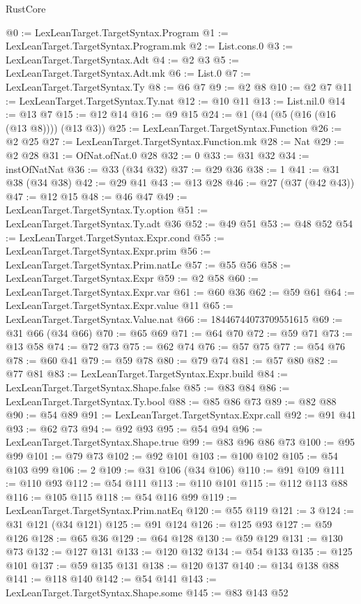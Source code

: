 \begin{lexlean}{RustCore}
\begin{coremodule}
@0 := LexLeanTarget.TargetSyntax.Program
@1 := LexLeanTarget.TargetSyntax.Program.mk
@2 := List.cons.{0}
@3 := LexLeanTarget.TargetSyntax.Adt
@4 := @2 @3
@5 := LexLeanTarget.TargetSyntax.Adt.mk
@6 := List.{0}
@7 := LexLeanTarget.TargetSyntax.Ty
@8 := @6 @7
@9 := @2 @8
@10 := @2 @7
@11 := LexLeanTarget.TargetSyntax.Ty.nat
@12 := @10 @11
@13 := List.nil.{0}
@14 := @13 @7
@15 := @12 @14
@16 := @9 @15
@24 := @1 (@4 (@5 (@16 (@16 (@13 @8)))) (@13 @3))
@25 := LexLeanTarget.TargetSyntax.Function
@26 := @2 @25
@27 := LexLeanTarget.TargetSyntax.Function.mk
@28 := Nat
@29 := @2 @28
@31 := OfNat.ofNat.{0} @28
@32 := 0
@33 := @31 @32
@34 := instOfNatNat
@36 := @33 (@34 @32)
@37 := @29 @36
@38 := 1
@41 := @31 @38 (@34 @38)
@42 := @29 @41
@43 := @13 @28
@46 := @27 (@37 (@42 @43))
@47 := @12 @15
@48 := @46 @47
@49 := LexLeanTarget.TargetSyntax.Ty.option
@51 := LexLeanTarget.TargetSyntax.Ty.adt @36
@52 := @49 @51
@53 := @48 @52
@54 := LexLeanTarget.TargetSyntax.Expr.cond
@55 := LexLeanTarget.TargetSyntax.Expr.prim
@56 := LexLeanTarget.TargetSyntax.Prim.natLe
@57 := @55 @56
@58 := LexLeanTarget.TargetSyntax.Expr
@59 := @2 @58
@60 := LexLeanTarget.TargetSyntax.Expr.var
@61 := @60 @36
@62 := @59 @61
@64 := LexLeanTarget.TargetSyntax.Expr.value @11
@65 := LexLeanTarget.TargetSyntax.Value.nat
@66 := 18446744073709551615
@69 := @31 @66 (@34 @66)
@70 := @65 @69
@71 := @64 @70
@72 := @59 @71
@73 := @13 @58
@74 := @72 @73
@75 := @62 @74
@76 := @57 @75
@77 := @54 @76
@78 := @60 @41
@79 := @59 @78
@80 := @79 @74
@81 := @57 @80
@82 := @77 @81
@83 := LexLeanTarget.TargetSyntax.Expr.build
@84 := LexLeanTarget.TargetSyntax.Shape.false
@85 := @83 @84
@86 := LexLeanTarget.TargetSyntax.Ty.bool
@88 := @85 @86 @73
@89 := @82 @88
@90 := @54 @89
@91 := LexLeanTarget.TargetSyntax.Expr.call
@92 := @91 @41
@93 := @62 @73
@94 := @92 @93
@95 := @54 @94
@96 := LexLeanTarget.TargetSyntax.Shape.true
@99 := @83 @96 @86 @73
@100 := @95 @99
@101 := @79 @73
@102 := @92 @101
@103 := @100 @102
@105 := @54 @103 @99
@106 := 2
@109 := @31 @106 (@34 @106)
@110 := @91 @109
@111 := @110 @93
@112 := @54 @111
@113 := @110 @101
@115 := @112 @113 @88
@116 := @105 @115
@118 := @54 @116 @99
@119 := LexLeanTarget.TargetSyntax.Prim.natEq
@120 := @55 @119
@121 := 3
@124 := @31 @121 (@34 @121)
@125 := @91 @124
@126 := @125 @93
@127 := @59 @126
@128 := @65 @36
@129 := @64 @128
@130 := @59 @129
@131 := @130 @73
@132 := @127 @131
@133 := @120 @132
@134 := @54 @133
@135 := @125 @101
@137 := @59 @135 @131
@138 := @120 @137
@140 := @134 @138 @88
@141 := @118 @140
@142 := @54 @141
@143 := LexLeanTarget.TargetSyntax.Shape.some
@145 := @83 @143 @52

\end{coremodule}
\end{lexlean}
